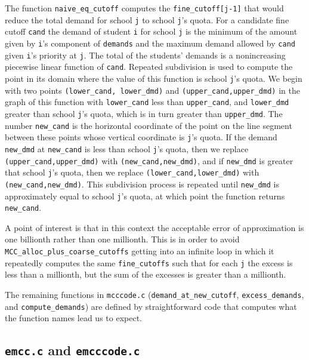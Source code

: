\documentclass[12pt]{article}
\theoremstyle{definition}
\begin{document}
\begin{appendix}
The function \texttt{naive\_eq\_cutoff} computes the
\texttt{fine\_cutoff[j-1]} that would reduce the total demand for
school \texttt{j} to school \texttt{j}'s quota.  For a candidate fine
cutoff \texttt{cand} the demand of student \texttt{i} for school
\texttt{j} is the minimum of the amount given by \texttt{i}'s
component of \texttt{demands} and the maximum demand allowed by
\texttt{cand} given \texttt{i}'s priority at \texttt{j}.  The total of
the students' demands is a nonincreasing piecewise linear function of
\texttt{cand}.  Repeated subdivision is used to compute the point in
its domain where the value of this function is school \texttt{j}'s
quota.  We begin with two points \texttt{(lower\_cand, lower\_dmd)}
and \texttt{(upper\_cand,upper\_dmd)} in the graph of this function
with \texttt{lower\_cand} less than \texttt{upper\_cand}, and
\texttt{lower\_dmd} greater than school \texttt{j}'s quota, which is
in turn greater than \texttt{upper\_dmd}.  The number
\texttt{new\_cand} is the horizontal coordinate of the point on the
line segment between these points whose vertical coordinate is
\texttt{j}'s quota.  If the demand \texttt{new\_dmd} at
\texttt{new\_cand} is less than school \texttt{j}'s quota, then we
replace \texttt{(upper\_cand,upper\_dmd)} with
\texttt{(new\_cand,new\_dmd)}, and if \texttt{new\_dmd} is greater
that school \texttt{j}'s quota, then we replace
\texttt{(lower\_cand,lower\_dmd)} with \texttt{(new\_cand,new\_dmd)}.
This subdivision process is repeated until \texttt{new\_dmd} is
approximately equal to school \texttt{j}'s quota, at which point the
function returns \texttt{new\_cand}.

A point of interest is that in this context the acceptable error of
approximation is one billionth rather than one millionth.  This is in
order to avoid \texttt{MCC\_alloc\_plus\_coarse\_cutoffs} getting into
an infinite loop in which it repeatedly computes the same
\texttt{fine\_cutoffs} such that for each \texttt{j} the excess is
less than a millionth, but the sum of the excesses is greater than a
millionth.

The remaining functions in \texttt{mcccode.c}
(\texttt{demand\_at\_new\_cutoff}, \texttt{excess\_demands}, and
\texttt{compute\_demands}) are defined by straightforward code that
computes what the function names lead us to expect.

\subsection{\texttt{emcc.c} and \texttt{emcccode.c}}


\end{appendix}
\end{document}
